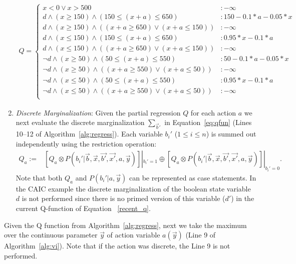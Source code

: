\documentclass[twoside,11pt]{article}
\begin{document}
\begin{enumerate}
{\footnotesize
\begin{align}
Q = \begin{cases}
x < 0 \vee x>500 &: -\infty \\
d \land (x \geq 150) \land (150 \leq (x+a) \leq 650) &:  150 - 0.1 * a - 0.05 * x \\
d \land (x \geq 150) \land ((x+a \geq 650) \vee (x+a \leq 150)) &:  -\infty \\
d \land (x \leq 150) \land (150 \leq (x+a) \leq 650)&:  0.95 * x - 0.1 * a \\
d \land (x \leq 150) \land ((x+a \geq 650) \vee (x+a \leq 150)) &:  -\infty \\
\neg d \land (x \geq 50) \land (50 \leq (x+a) \leq 550)  &:  50 - 0.1 * a - 0.05 * x \\
\neg d \land (x \geq 50) \land ((x+a \geq 550) \vee (x+a \leq 50)) &:  -\infty \\
\neg d \land (x \leq 50) \land (50 \leq (x+a) \leq 550) &:  0.95 * x - 0.1 * a \\
\neg d \land (x \leq 50) \land ((x+a \geq 550) \vee (x+a \leq 50)) &:  -\infty \\
\end{cases} \label{recent_q}
\end{align}
}

\item {\it Discrete Marginalization}: Given the partial
regression $Q$ for each action $a$ we next evaluate the discrete 
marginalization $\sum_{\vec{b}'}$ in Equation~\eqref{eq:qfun} (Lines 10--12 of Algorithm~\ref{alg:regress}).
Each variable $b_i'$ ($1 \leq i \leq n$)  is summed out independently using the restriction operation:
\begin{align*}
Q_a := & \left[ Q_a \otimes \mathit{P}(b_i'|\vec{b},\vec{x},\vec{b'},\vec{x'},a,\vec{y}) \right]|_{b_i' = 1} 
 \oplus \left[ Q_a \otimes \mathit{P}(b_i'|\vec{b},\vec{x},\vec{b'},\vec{x'},a,\vec{y}) \right]|_{b_i' = 0}.
\end{align*}
Note that both $Q_a$ and $\mathit{P}(b_i'|a,\vec{y})$ can be represented
as case statements.
In the \textsc{CAIC} example the discrete marginalization of the boolean state variable $d$ is not performed since there is no primed version of this variable ($d'$) in the current Q-function of Equation ~\eqref{recent_q}. 
\end{enumerate}

Given the Q function from Algorithm~\ref{alg:regress}, next we take the maximum over the continuous parameter $\vec{y}$ of action variable $a(\vec{y})$ (Line 9 of Algorithm~\ref{alg:vi}). Note that if the action was discrete, the Line 9 is not performed.
\end{document}

